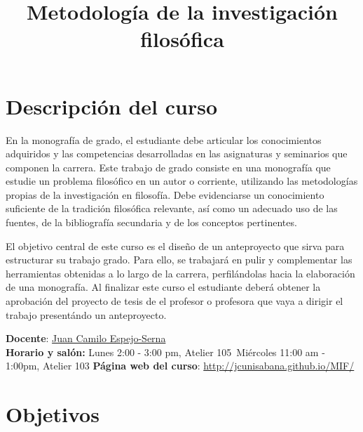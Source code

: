 \documentclass[]{article}
\title{Metodología de la investigación filosófica}
\author{}
\date{}
\begin{document}
\maketitle

\section{Descripción del curso}\label{descripcion-del-curso}

En la monografía de grado, el estudiante debe articular los
conocimientos adquiridos y las competencias desarrolladas en las
asignaturas y seminarios que componen la carrera. Este trabajo de grado
consiste en una monografía que estudie un problema filosófico en un
autor o corriente, utilizando las metodologías propias de la
investigación en filosofía. Debe evidenciarse un conocimiento suficiente
de la tradición filosófica relevante, así como un adecuado uso de las
fuentes, de la bibliografía secundaria y de los conceptos pertinentes.

El objetivo central de este curso es el diseño de un anteproyecto que
sirva para estructurar su trabajo grado. Para ello, se trabajará en
pulir y complementar las herramientas obtenidas a lo largo de la
carrera, perfilándolas hacia la elaboración de una monografía. Al
finalizar este curso el estudiante deberá obtener la aprobación del
proyecto de tesis de el profesor o profesora que vaya a dirigir el
trabajo presentándo un anteproyecto.

\textbf{Docente}: \href{../index.html}{Juan Camilo Espejo-Serna}\\
\textbf{Horario y salón:} Lunes 2:00 - 3:00 pm, Atelier 105~Miércoles
11:00 am - 1:00pm, Atelier 103 \textbf{Página web del curso}:
\url{http://jcunisabana.github.io/MIF/}

\section{Objetivos}\label{objetivos}
\end{document}
